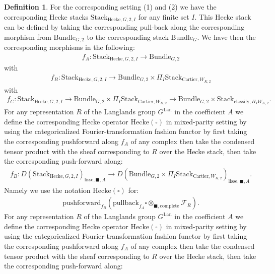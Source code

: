\documentclass[12pt]{book}
\theoremstyle{definition}
\newtheorem{definition}{Definition}
\begin{document}
\begin{definition}
For the corresponding setting (1) and (2) we have the corresponding Hecke stacks $\mathrm{Stack}_{\mathrm{Hecke},G,2,I}$ for any finite set $I$. This Hecke stack can be defined by taking the corresponding pull-back along the corresponding morphism from $\mathrm{Bundle}_{G,2}$ to the corresponding stack $\mathrm{Bundle}_{G}$. We have then the corresponding morphisms in the following:
\begin{align}
f_A: \mathrm{Stack}_{\mathrm{Hecke},G,2,I} \rightarrow \mathrm{Bundle}_{G,2}
\end{align}
with
\begin{align}
f_B: \mathrm{Stack}_{\mathrm{Hecke},G,2,I} \rightarrow \mathrm{Bundle}_{G,2}\times \Pi_I \mathrm{Stack}_{\mathrm{Cartier},W_{K,2}}
\end{align}
with
\begin{align}
f_C: \mathrm{Stack}_{\mathrm{Hecke},G,2,I} \rightarrow \mathrm{Bundle}_{G,2}\times \Pi_I \mathrm{Stack}_{\mathrm{Cartier},W_{K,2}}\rightarrow \mathrm{Bundle}_{G,2}\times \mathrm{Stack}_{\mathrm{classify},\Pi_I W_{K,2}}.
\end{align}
For any representation $R$ of the Langlands group $G^\mathrm{Lan}$ in the coefficient $A$ we define the corresponding Hecke operator $\mathrm{Hecke}(\square)$ in mixed-parity setting by using the categoricalized Fourier-transformation fashion functor by first taking the corresponding pushforward along $f_A$ of any complex then take the condensed tensor product with the sheaf corresponding to $R$ over the Hecke stack, then take the corresponding push-forward along:
\begin{align}
f_B: D(\mathrm{Stack}_{\mathrm{Hecke},G,2,I})_{\text{lisse},\blacksquare,A} \rightarrow D(\mathrm{Bundle}_{G,2}\times \Pi_I \mathrm{Stack}_{\mathrm{Cartier},W_{K,2}})_{\text{lisse},\blacksquare,A}.
\end{align}
Namely we use the notation $\mathrm{Hecke}(\square)$ for:
\begin{align}
\mathrm{pushforward}_{f_B}(\mathrm{pullback}_{f_A}\square\otimes_{\blacksquare,\mathrm{complete}}\mathcal{F}_R).
\end{align}
For any representation $R$ of the Langlands group $G^\mathrm{Lan}$ in the coefficient $A$ we define the corresponding Hecke operator $\mathrm{Hecke}(\square)$ in mixed-parity setting by using the categoricalized Fourier-transformation fashion functor by first taking the corresponding pushforward along $f_A$ of any complex then take the condensed tensor product with the sheaf corresponding to $R$ over the Hecke stack, then take the corresponding push-forward along:

\end{definition}
\end{document}
